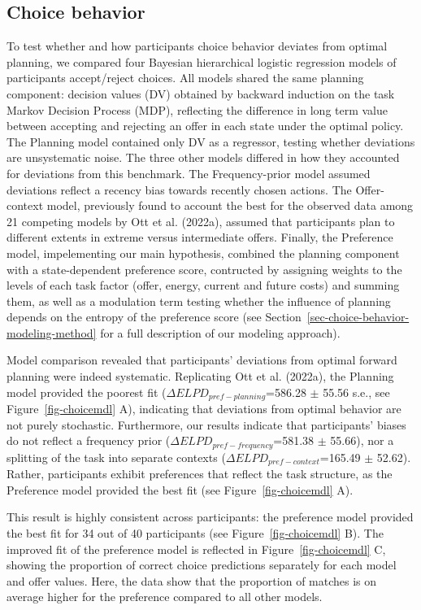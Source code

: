 \documentclass[
  letterpaper,
  DIV=11,
  numbers=noendperiod]{scrartcl}
\begin{document}
\subsection{Choice behavior}\label{choice-behavior}

To test whether and how participants choice behavior deviates from
optimal planning, we compared four Bayesian hierarchical logistic
regression models of participants accept/reject choices. All models
shared the same planning component: decision values (DV) obtained by
backward induction on the task Markov Decision Process (MDP), reflecting
the difference in long term value between accepting and rejecting an
offer in each state under the optimal policy. The Planning model
contained only DV as a regressor, testing whether deviations are
unsystematic noise. The three other models differed in how they
accounted for deviations from this benchmark. The Frequency-prior model
assumed deviations reflect a recency bias towards recently chosen
actions. The Offer-context model, previously found to account the best
for the observed data among 21 competing models by Ott et al. (2022a),
assumed that participants plan to different extents in extreme versus
intermediate offers. Finally, the Preference model, impelementing our
main hypothesis, combined the planning component with a state-dependent
preference score, contructed by assigning weights to the levels of each
task factor (offer, energy, current and future costs) and summing them,
as well as a modulation term testing whether the influence of planning
depends on the entropy of the preference score (see
Section~\ref{sec-choice-behavior-modeling-method} for a full description
of our modeling approach).

Model comparison revealed that participants' deviations from optimal
forward planning were indeed systematic. Replicating Ott et al. (2022a),
the Planning model provided the poorest fit
(\(\Delta ELPD_{pref - planning}\)=586.28 \(\pm\) 55.56 s.e., see
Figure~\ref{fig-choicemdl} A), indicating that deviations from optimal
behavior are not purely stochastic. Furthermore, our results indicate
that participants' biases do not reflect a frequency prior
(\(\Delta ELPD_{pref - frequency}\)=581.38 \(\pm\) 55.66), nor a
splitting of the task into separate contexts
(\(\Delta ELPD_{pref - context}\)=165.49 \(\pm\) 52.62). Rather,
participants exhibit preferences that reflect the task structure, as the
Preference model provided the best fit (see Figure~\ref{fig-choicemdl}
A).

This result is highly consistent across participants: the preference
model provided the best fit for 34 out of 40 participants (see
Figure~\ref{fig-choicemdl} B). The improved fit of the preference model
is reflected in Figure~\ref{fig-choicemdl} C, showing the proportion of
correct choice predictions separately for each model and offer values.
Here, the data show that the proportion of matches is on average higher
for the preference compared to all other models.
\end{document}
